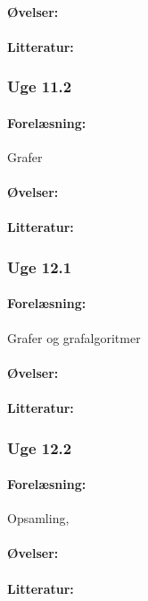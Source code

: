 \documentclass[12pt]{article}
\begin{document}
\paragraph{Øvelser:}
\paragraph{Litteratur:}
\subsubsection{Uge 11.2}
\paragraph{Forelæsning:} 
Grafer 
\paragraph{Øvelser:}
\paragraph{Litteratur:}

\subsubsection{Uge 12.1}
\paragraph{Forelæsning:} 
Grafer og grafalgoritmer
\paragraph{Øvelser:}
\paragraph{Litteratur:}
\subsubsection{Uge 12.2}
\paragraph{Forelæsning:} 
Opsamling, 
\paragraph{Øvelser:}
\paragraph{Litteratur:}
\end{document}
